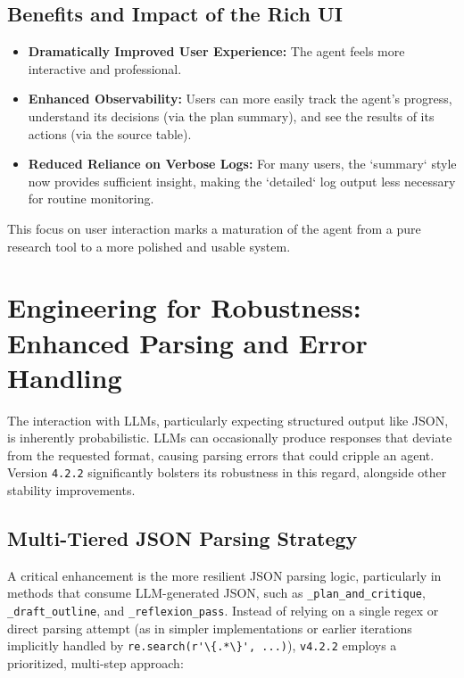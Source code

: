 \documentclass[12pt, a4paper]{article}
\begin{document}
\subsection{Benefits and Impact of the Rich UI}
\begin{itemize}
    \item \textbf{Dramatically Improved User Experience:} The agent feels more interactive and professional.
    \item \textbf{Enhanced Observability:} Users can more easily track the agent's progress, understand its decisions (via the plan summary), and see the results of its actions (via the source table).
    \item \textbf{Reduced Reliance on Verbose Logs:} For many users, the `summary` style now provides sufficient insight, making the `detailed` log output less necessary for routine monitoring.
\end{itemize}
This focus on user interaction marks a maturation of the agent from a pure research tool to a more polished and usable system.

\section{Engineering for Robustness: Enhanced Parsing and Error Handling}

The interaction with LLMs, particularly expecting structured output like JSON, is inherently probabilistic. LLMs can occasionally produce responses that deviate from the requested format, causing parsing errors that could cripple an agent. Version \verb|4.2.2| significantly bolsters its robustness in this regard, alongside other stability improvements.

\subsection{Multi-Tiered JSON Parsing Strategy}
A critical enhancement is the more resilient JSON parsing logic, particularly in methods that consume LLM-generated JSON, such as \verb|_plan_and_critique|, \verb|_draft_outline|, and \verb|_reflexion_pass|. Instead of relying on a single regex or direct parsing attempt (as in simpler implementations or earlier iterations implicitly handled by \verb|re.search(r'\{.*\}', ...)|), \verb|v4.2.2| employs a prioritized, multi-step approach:
\end{document}
